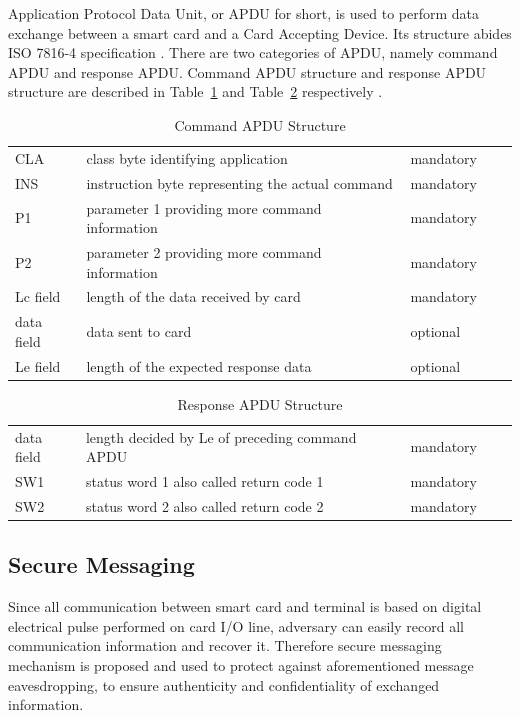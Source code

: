 Application Protocol Data Unit, or APDU for short, is used  to perform data exchange between a smart card and a Card Accepting Device.  Its structure abides ISO 7816-4 specification \cite{chen}. There are two categories of APDU, namely command APDU and response APDU. Command APDU structure and response APDU structure are described in Table~\ref{table:capdu} and Table~\ref{table:rapdu} respectively \cite{handbuch}. 

\begin{table}[!htbp]
\caption{Command APDU Structure}
\centering
\begin{tabular}{lllll}
\hline\hline
 CLA &class byte identifying application  & mandatory \\[0.5ex]
 INS &instruction byte representing the actual command  & mandatory \\
 P1 &parameter 1 providing more command information & mandatory \\
 P2 &parameter 2 providing more command information& mandatory \\
 Lc field & length of the data received by card & mandatory \\
 data field &data sent to card& optional \\
Le field & length of the expected response data& optional \\
\hline
\end{tabular}
\label{table:capdu}
\end{table}

\begin{table}[ht]
\caption{Response APDU Structure}
\centering
\begin{tabular}{lllll}
\hline\hline
 data field & length decided by Le of preceding command  APDU  & mandatory \\[0.5ex]
 SW1 &status word 1 also called return code 1  & mandatory \\
 SW2 &status word 2 also called return code 2& mandatory \\
\hline
\end{tabular}
\label{table:rapdu}
\end{table}

\subsection{Secure Messaging} \label{secTLV}
Since all communication between smart card and terminal is based on digital electrical pulse performed on card I/O line, adversary can easily record all communication information and recover it. Therefore secure messaging mechanism is proposed and used to protect against aforementioned message eavesdropping, to ensure authenticity and confidentiality of exchanged information.

